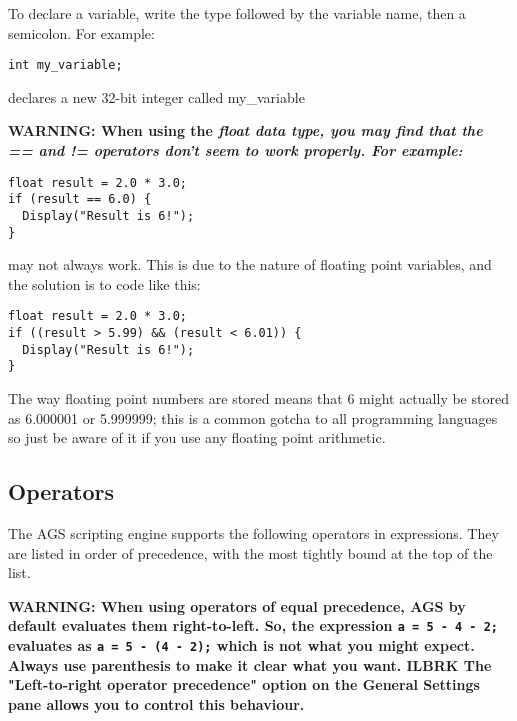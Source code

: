 To declare a variable, write the type followed by the variable name, then a semicolon.
For example:

\verb$int my_variable;$

declares a new 32-bit integer called  my_variable

\bf{WARNING:} When using the \it{float} data type, you may find that the == and != operators
don't seem to work properly. For example:
\begin{verbatim}
float result = 2.0 * 3.0;
if (result == 6.0) {
  Display("Result is 6!");
}
\end{verbatim}
may not always work. This is due to the nature of floating point variables, and the solution
is to code like this:
\begin{verbatim}
float result = 2.0 * 3.0;
if ((result > 5.99) && (result < 6.01)) {
  Display("Result is 6!");
}
\end{verbatim}
The way floating point numbers are stored means that 6 might actually be stored as 6.000001
or 5.999999; this is a common gotcha to all programming languages so just be aware of it
if you use any floating point arithmetic.


\subsection{Operators}%

The AGS scripting engine supports the following operators in expressions. They are listed
in order of precedence, with the most tightly bound at the top of the list.

\bf{WARNING:} When using operators of equal precedence, AGS by default evaluates them
right-to-left. So, the expression \verb$a = 5 - 4 - 2;$ evaluates as \verb$a = 5 - (4 - 2);$
which is not what you might expect. Always use parenthesis to make it clear what you want. ILBRK
The "Left-to-right operator precedence" option on the General Settings pane allows you to
control this behaviour.

